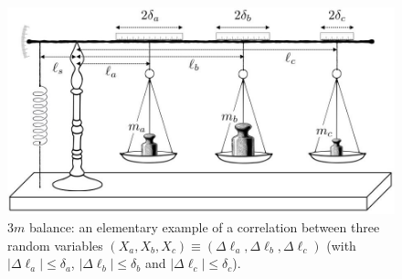 \begin{figure}[h!]
 \centering
   \includegraphics[width=4.5in]{3M-balance.jpeg} 
   \caption{3$m$ balance: an elementary example of a correlation between three random variables $(X_a, X_b, X_c) \equiv (\Delta \ell_a, \Delta \ell_b, \Delta \ell_c)$ (with $| \Delta \ell_a | \le \delta_a$, $| \Delta \ell_b | \le \delta_b$ and $| \Delta \ell_c | \le \delta_c$).}
   \label{3M-balance}
\end{figure} 

